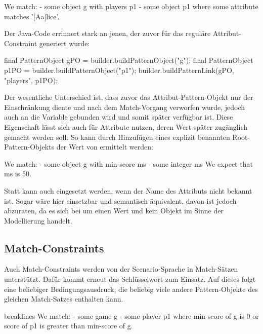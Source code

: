 \begin{mdcodeblock}
    We match:
    - some object g with players p1
    - some object p1 where some attribute matches '[Aa]lice'.
\end{mdcodeblock}

Der Java-Code errinnert stark an jenen, der zuvor für das reguläre Attribut-Constraint generiert wurde:

\begin{jcodeblock}
    final PatternObject gPO = builder.buildPatternObject("g");
    final PatternObject p1PO = builder.buildPatternObject("p1");
    builder.buildPatternLink(gPO, "players", p1PO);
\end{jcodeblock}

Der wesentliche Unterschied ist, dass zuvor das Attribut-Pattern-Objekt  nur der Einschränkung diente und nach dem Match-Vorgang verworfen wurde,
 jedoch auch an die Variable  gebunden wird und somit später verfügbar ist.
Diese Eigenschaft lässt sich auch für Attribute nutzen, deren Wert später zugänglich gemacht werden soll.
So kann durch Hinzufügen eines explizit benannten Root-Pattern-Objekts der Wert von  ermittelt werden:

\begin{mdcodeblock}
    We match:
    - some object g with min-score ms
    - some integer ms
    We expect that ms is 50.
\end{mdcodeblock}

Statt  kann auch  eingesetzt werden, wenn der Name des Attributs nicht bekannt ist.
Sogar  wäre hier einsetzbar und semantisch äquivalent,
davon ist jedoch abzuraten, da es sich bei  um einen Wert und kein Objekt im Sinne der Modellierung handelt.

\subsection{Match-Constraints}

Auch Match-Constraints werden von der Scenario-Sprache in Match-Sätzen unterstützt.
Dafür kommt erneut das Schlüsselwort  zum Einsatz.
Auf dieses folgt eine beliebiger Bedingungsausdruck, die beliebig viele andere Pattern-Objekte des gleichen Match-Satzes enthalten kann.

\begin{mdcodeblock*}{breaklines}
    We match:
    - some game g
    - some player p1
    where min-score of g is 0 or score of p1 is greater than min-score of g.
\end{mdcodeblock*}

